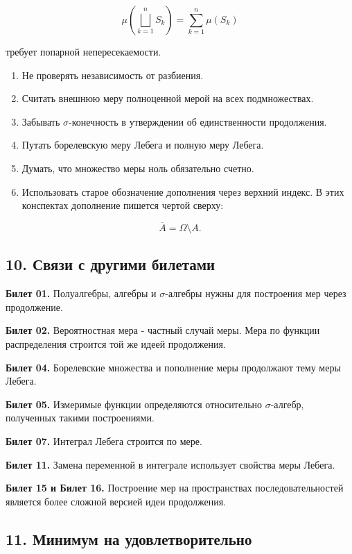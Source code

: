 \documentclass[
  11pt,
  a4paper,
]{article}
\begin{document}
\[
\mu\left(\bigsqcup_{k=1}^nS_k\right)=\sum_{k=1}^n\mu(S_k)
\]

требует попарной непересекаемости.

\begin{enumerate}
\def\labelenumi{\arabic{enumi}.}
\setcounter{enumi}{2}
\item
  Не проверять независимость от разбиения.
\item
  Считать внешнюю меру полноценной мерой на всех подмножествах.
\item
  Забывать \(\sigma\)-конечность в утверждении об единственности
  продолжения.
\item
  Путать борелевскую меру Лебега и полную меру Лебега.
\item
  Думать, что множество меры ноль обязательно счетно.
\item
  Использовать старое обозначение дополнения через верхний индекс. В
  этих конспектах дополнение пишется чертой сверху:
\end{enumerate}

\[
\overline{A}=\Omega\setminus A.
\]

\subsection{10. Связи с другими
билетами}\label{ux441ux432ux44fux437ux438-ux441-ux434ux440ux443ux433ux438ux43cux438-ux431ux438ux43bux435ux442ux430ux43cux438}

\textbf{Билет 01.} Полуалгебры, алгебры и \(\sigma\)-алгебры нужны для
построения мер через продолжение.

\textbf{Билет 02.} Вероятностная мера - частный случай меры. Мера по
функции распределения строится той же идеей продолжения.

\textbf{Билет 04.} Борелевские множества и пополнение меры продолжают
тему меры Лебега.

\textbf{Билет 05.} Измеримые функции определяются относительно
\(\sigma\)-алгебр, полученных такими построениями.

\textbf{Билет 07.} Интеграл Лебега строится по мере.

\textbf{Билет 11.} Замена переменной в интеграле использует свойства
меры Лебега.

\textbf{Билет 15 и Билет 16.} Построение мер на пространствах
последовательностей является более сложной версией идеи продолжения.

\subsection{11. Минимум на
удовлетворительно}\label{ux43cux438ux43dux438ux43cux443ux43c-ux43dux430-ux443ux434ux43eux432ux43bux435ux442ux432ux43eux440ux438ux442ux435ux43bux44cux43dux43e}
\end{document}

